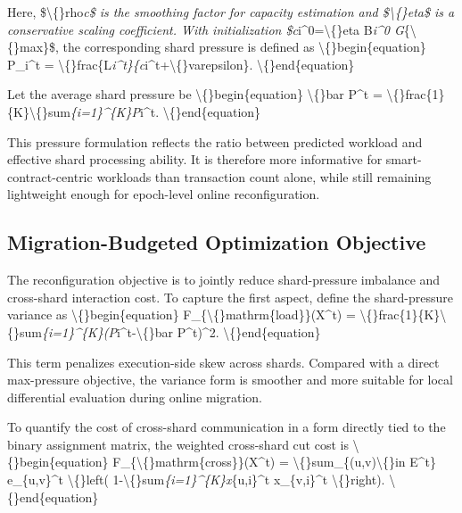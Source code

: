 \documentclass{article}
\begin{document}
Here, \$\textbackslash\{\}rho\emph{c\$ is the smoothing factor for capacity estimation and \$\textbackslash\{\}eta\$ is a conservative scaling coefficient. With initialization \$c}i^0=\textbackslash\{\}eta B\emph{i^0 G}\{\textbackslash\{\}max\}\$, the corresponding shard pressure is defined as
\textbackslash\{\}begin\{equation\}
P\_i^t
=
\textbackslash\{\}frac\{L\emph{i^t\}\{c}i^t+\textbackslash\{\}varepsilon\}.
\textbackslash\{\}end\{equation\}

Let the average shard pressure be
\textbackslash\{\}begin\{equation\}
\textbackslash\{\}bar P^t
=
\textbackslash\{\}frac\{1\}\{K\}\textbackslash\{\}sum\emph{\{i=1\}^\{K\}P}i^t.
\textbackslash\{\}end\{equation\}

This pressure formulation reflects the ratio between predicted workload and effective shard processing ability. It is therefore more informative for smart-contract-centric workloads than transaction count alone, while still remaining lightweight enough for epoch-level online reconfiguration.

\subsection{Migration-Budgeted Optimization Objective}\label{sec:migration-budgeted-optimization-objective}

The reconfiguration objective is to jointly reduce shard-pressure imbalance and cross-shard interaction cost. To capture the first aspect, define the shard-pressure variance as
\textbackslash\{\}begin\{equation\}
F\_\{\textbackslash\{\}mathrm\{load\}\}(X^t)
=
\textbackslash\{\}frac\{1\}\{K\}\textbackslash\{\}sum\emph{\{i=1\}^\{K\}(P}i^t-\textbackslash\{\}bar P^t)^2.
\textbackslash\{\}end\{equation\}

This term penalizes execution-side skew across shards. Compared with a direct max-pressure objective, the variance form is smoother and more suitable for local differential evaluation during online migration.

To quantify the cost of cross-shard communication in a form directly tied to the binary assignment matrix, the weighted cross-shard cut cost is
\textbackslash\{\}begin\{equation\}
F\_\{\textbackslash\{\}mathrm\{cross\}\}(X^t)
=
\textbackslash\{\}sum\_\{(u,v)\textbackslash\{\}in E^t\}
e\_\{u,v\}^t
\textbackslash\{\}left(
1-\textbackslash\{\}sum\emph{\{i=1\}^\{K\}x}\{u,i\}^t x\_\{v,i\}^t
\textbackslash\{\}right).
\textbackslash\{\}end\{equation\}
\end{document}
